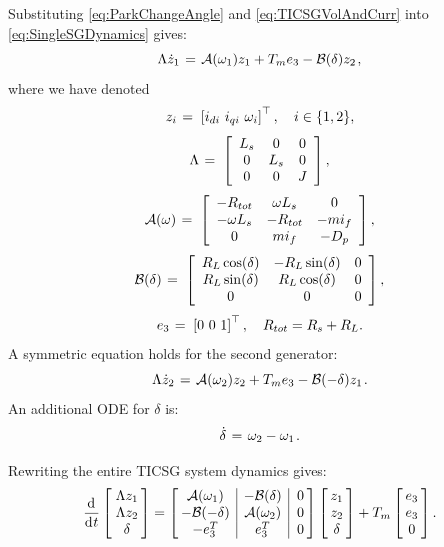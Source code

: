 \documentclass{ifacconf}
\newcommand{\BE}{\begin{equation}}
\newcommand{\BEQ}[1]{\BE\label{#1}} %
\renewcommand{\L}    {{\Lambda}}
\renewcommand{\o}    {{\omega}}
\newcommand{\m}      {{\hbox{\hskip 1pt}}}
\newcommand{\nm}     {{\hbox{\hskip -3pt}}}
\newcommand{\dd}     {{\rm d\hbox{\hskip 0.5pt}}}
\newcommand{\Amscr}  {{\mathcal{A}}}
\newcommand{\Bmscr}  {{\mathcal{B}}}
\begin{document}
Substituting \eqref{eq:ParkChangeAngle} and \eqref{eq:TICSGVolAndCurr}
into \eqref{eq:SingleSGDynamics} gives:
$$ \L\dot{z}_1 \m=\m \Amscr(\o_1)z_1+T_m e_3 - \Bmscr(\delta)z_2 \m,$$
where we have denoted
\BEQ{fiuk_szultesnapja}
   z_i \m=\m \left[i_{di}\ i_{qi}\ \o_i\right]^\top,\quad 
   i\in\{1,2\},
\end{equation}
$$ \L \m=\m \left[\begin{array}{ccc} L_s & 0 & 0\\
   0 & L_s & 0\\ 0 & 0 & J \end{array}\right],$$
$$ \Amscr(\o) \m=\m \left[\begin{array}{ccc}
   -R_{tot} & \o L_s & 0\\ -\o L_s & -R_{tot} & -mi_{f}\\
   0 & mi_{f} & -D_{p} \end{array}\right],$$
$$ \Bmscr(\delta) \m=\m \left[\begin{array}{ccc}
   R_L\cos(\delta) & -R_{L}\sin(\delta) & 0\\ R_L\sin(\delta) & 
   R_L\cos(\delta) & 0\\ 0 & 0 & 0 \end{array}\right],$$
$$e_3 \m=\m \left[0\ 0\ 1\right]^\top, \quad  R_{tot}=R_{s}+R_{L}.$$
A symmetric equation holds for the second generator:
$$ \L\dot{z}_2 \m=\m \Amscr(\o_{2})z_{2}+T_{m}e_{3} -
   \Bmscr(-\delta)z_{1} \m.$$
An additional ODE for $\delta$ is:
$$\dot{\delta} \m=\m \o_2-\o_1 \m.$$

Rewriting the entire TICSG system dynamics gives:
\begin{equation} \label{eq:TICSGDynamics}
   \frac{\dd}{\dd t}\left[\nm\m\begin{array}{c} \L z_{1}\\
   \L z_{2}\\ \delta \end{array}\nm\right] = \left[\nm
   \begin{array}{c|c|c} \Amscr(\o_1) & -\Bmscr(\delta)
   & \m 0\\ -\Bmscr(-\delta) & \Amscr(\o_2) & \m 0\\ -e_{3}^T
   & e_3^T & \m 0 \end{array}\nm\right] \left[\nm\begin{array}{c} z_1
   \\ z_2\\ \delta \end{array}\nm\right] + T_m \left[\nm 
   \begin{array}{c} e_{3}\\ e_{3}\\ 0 \end{array} \nm\right].
\end{equation}
\end{document}
